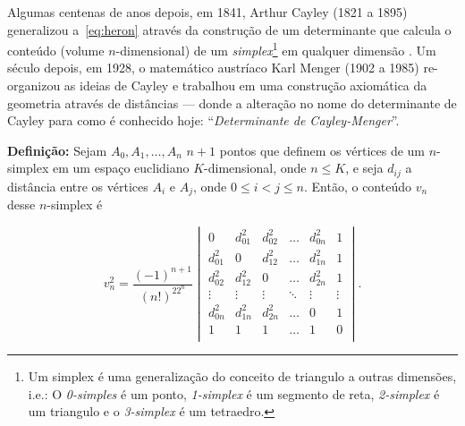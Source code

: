 \documentclass[a4paper,12pt]{article}
\begin{document}
Algumas centenas de anos depois, em 1841, Arthur Cayley (1821 a 1895) generalizou a~\ref{eq:heron} através da construção de um determinante que calcula o conteúdo (volume $n$-dimensional) de um \textit{simplex}\footnote{Um simplex é uma generalização do conceito de triangulo a outras dimensões, i.e.: O \textit{0-simples} é um ponto, \textit{1-simplex} é um segmento de reta, \textit{2-simplex} é um triangulo e o \textit{3-simplex} é um tetraedro.} em qualquer dimensão \cite{cayley1841HaronGD}. Um século depois, em 1928, o matemático austríaco Karl Menger (1902 a 1985) re-organizou as ideias de Cayley e trabalhou em uma construção axiomática da geometria através de distâncias \cite{mengerDeterminante} --- donde a alteração no nome do determinante de Cayley para como é conhecido hoje: ``\textit{Determinante de Cayley-Menger}''.  

\begin{center}
	\begin{minipage}{0.9 \linewidth}
		\textbf{Definição:} Sejam $A_0, A_1, \dots, A_n$ $n + 1$ pontos que definem os vértices de um $n$-simplex em um espaço euclidiano $K$-dimensional, onde $n\leq K$, e seja $d_{ij}$ a distância entre os vértices $A_i$ e $A_j$, onde $0\leq i < j \leq n$. Então, o conteúdo $v_n$ desse $n$-simplex é
	\end{minipage}
\end{center} 

\vspace{-0.5cm}

\begin{equation}\tag{Determinante de Cayley-Menger}
v_n^2 = \frac{(-1)^{n+1}}{(n!)^22^n}
\begin{vmatrix}
0 & d^2_{01} &  d^2_{02} & \ldots & d^2_{0n} & 1\\ 
d^2_{01} & 0 & d^2_{12} & \ldots & d^2_{1n} & 1\\ 
d^2_{02} & d^2_{12} &  0 & \ldots & d^2_{2n} & 1\\ 
\vdots & \vdots &  \vdots & \ddots & \vdots & \vdots\\ 
d^2_{0n} & d^2_{1n} & d^2_{2n}  & \ldots & 0 & 1\\ 
1 & 1 & 1  & \ldots & 1 & 0\\ 
\end{vmatrix}.
\label{determinanteCayleyMenger}
\end{equation}
\end{document}
